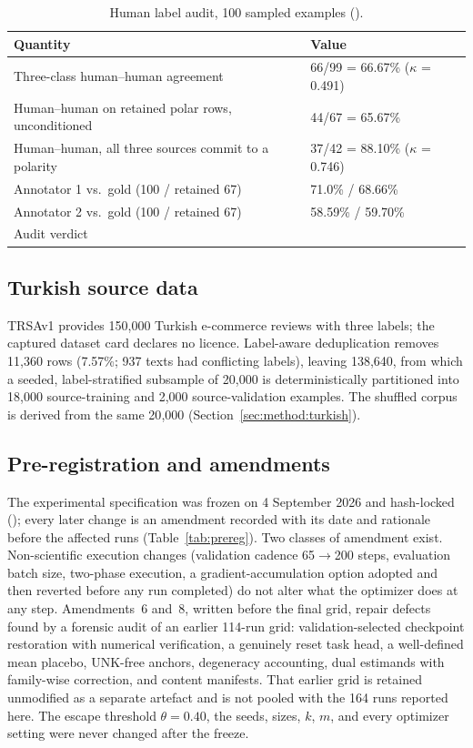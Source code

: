 \begin{table}[!t]
\caption{Human label audit, 100 sampled examples ().}
\label{tab:audit}
\centering
\scriptsize
\begin{tabular}{@{}L{4.5cm}R{4.1cm}@{}}
\toprule
Quantity & Value \\
\midrule
Three-class human–human agreement & 66/99 = 66.67\% ($\kappa$ = 0.491) \\
Human–human on retained polar rows, unconditioned & 44/67 = 65.67\% \\
Human–human, all three sources commit to a polarity & 37/42 = 88.10\% ($\kappa$ = 0.746) \\
Annotator 1 vs.\ gold (100 / retained 67) & 71.0\% / 68.66\% \\
Annotator 2 vs.\ gold (100 / retained 67) & 58.59\% / 59.70\% \\
Audit verdict &  \\
\bottomrule
\end{tabular}
\end{table}

\subsection{Turkish source data}
TRSAv1 \cite{aydogan2023trsav1} provides 150{,}000 Turkish e-commerce reviews with three labels; the captured dataset card declares no licence. Label-aware deduplication removes 11{,}360 rows (7.57\%; 937 texts had conflicting labels), leaving 138{,}640, from which a seeded, label-stratified subsample of 20{,}000 is deterministically partitioned into 18{,}000 source-training and 2{,}000 source-validation examples. The shuffled corpus is derived from the same 20{,}000 (Section~\ref{sec:method:turkish}).

\subsection{Pre-registration and amendments}
\label{sec:setup:prereg}
The experimental specification was frozen on 4 September 2026 and hash-locked (); every later change is an amendment recorded with its date and rationale before the affected runs (Table~\ref{tab:prereg}). Two classes of amendment exist. Non-scientific execution changes (validation cadence 65$\to$200 steps, evaluation batch size, two-phase execution, a gradient-accumulation option adopted and then reverted before any run completed) do not alter what the optimizer does at any step. Amendments~6 and~8, written before the final grid, repair defects found by a forensic audit of an earlier 114-run grid: validation-selected checkpoint restoration with numerical verification, a genuinely reset task head, a well-defined mean placebo, UNK-free anchors, degeneracy accounting, dual estimands with family-wise correction, and content manifests. That earlier grid is retained unmodified as a separate artefact and is not pooled with the 164 runs reported here. The escape threshold $\theta=0.40$, the seeds, sizes, $k$, $m$, and every optimizer setting were never changed after the freeze.

